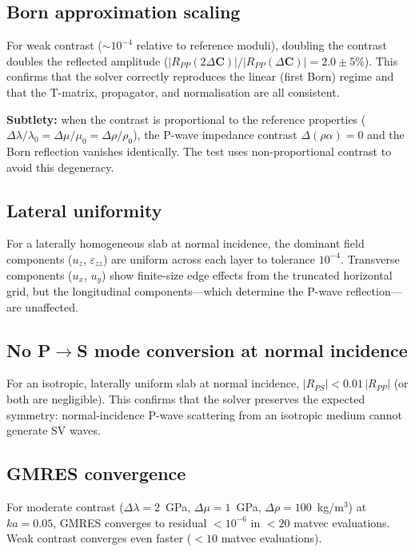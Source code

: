 \documentclass[11pt,a4paper]{article}
\newcommand{\D}{\Delta}
\newcommand{\bC}{\bm{C}}
\begin{document}
\subsection{Born approximation scaling}

For weak contrast ($\sim 10^{-4}$ relative to reference moduli),
doubling the contrast doubles the reflected amplitude
($|R_{PP}(2\D\bC)| / |R_{PP}(\D\bC)| = 2.0 \pm 5\%$).
This confirms that the solver correctly reproduces the linear
(first Born) regime and that the T-matrix, propagator, and
normalisation are all consistent.

\textbf{Subtlety:} when the contrast is proportional to the
reference properties ($\D\lambda / \lambda_0 = \D\mu / \mu_0
= \D\rho / \rho_0$), the P-wave impedance contrast
$\D(\rho\alpha) = 0$ and the Born reflection vanishes identically.
The test uses non-proportional contrast to avoid this degeneracy.

\subsection{Lateral uniformity}

For a laterally homogeneous slab at normal incidence, the dominant
field components ($u_z$, $\varepsilon_{zz}$) are uniform across
each layer to tolerance $10^{-4}$.  Transverse components
($u_x$, $u_y$) show finite-size edge effects from the truncated
horizontal grid, but the longitudinal components---which determine
the P-wave reflection---are unaffected.

\subsection{No P$\to$S mode conversion at normal incidence}

For an isotropic, laterally uniform slab at normal incidence,
$|R_{PS}| < 0.01\,|R_{PP}|$ (or both are negligible).  This
confirms that the solver preserves the expected symmetry:
normal-incidence P-wave scattering from an isotropic medium
cannot generate SV waves.

\subsection{GMRES convergence}

For moderate contrast ($\D\lambda = 2$~GPa, $\D\mu = 1$~GPa,
$\D\rho = 100$~kg/m$^3$) at $ka = 0.05$, GMRES converges to
residual $< 10^{-6}$ in $< 20$ matvec evaluations.  Weak contrast
converges even faster ($< 10$ matvec evaluations).
\end{document}
